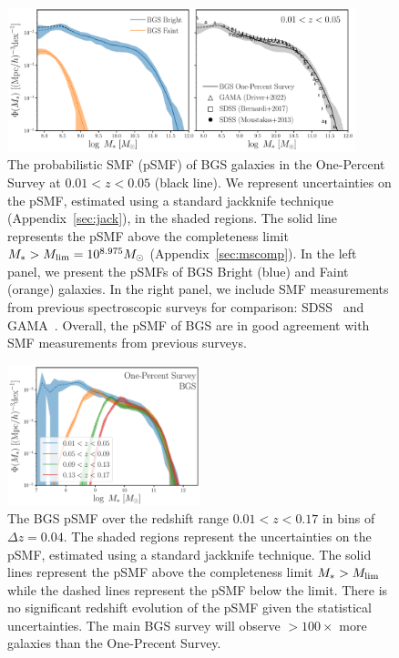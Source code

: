 \begin{figure}
\begin{center}
    \includegraphics[width=0.9\textwidth]{figs/psmf_bgs_any_comp.pdf} 
    \caption{
        The probabilistic SMF (pSMF) of BGS galaxies in the One-Percent Survey
        at $0.01 < z < 0.05$ (black line). 
        We represent uncertainties on the pSMF, estimated using a standard
        jackknife technique (Appendix~\ref{sec:jack}), in the shaded regions.
        The solid line represents the pSMF above the completeness limit 
        $M_* > M_{\rm lim} = 10^{8.975}M_\odot$ (Appendix~\ref{sec:mscomp}).
        In the left panel, we present the pSMFs of BGS Bright (blue) and
        Faint (orange) galaxies. 
        In the right panel, we include SMF measurements from previous
        spectroscopic surveys for comparison: SDSS~\citep{moustakas2013,
        bernardi2017} and GAMA~\citep{driver2022}. 
        Overall, the pSMF of BGS are in good agreement with SMF
        measurements from previous surveys.  
    }\label{fig:psmf}
\end{center}
\end{figure}

\begin{figure}
\begin{center}
    \includegraphics[width=0.5\textwidth]{figs/psmf_bgs_any_zevo.pdf} 
    \caption{
        The BGS pSMF over the redshift range $0.01 < z < 0.17$ in bins of
        $\Delta z = 0.04$. 
        The shaded regions represent the uncertainties on the pSMF, estimated
        using a standard jackknife technique.
        The solid lines represent the pSMF above the completeness limit 
        $M_* > M_{\rm lim}$ while the dashed lines represent the pSMF below
        the limit.
        There is no significant redshift evolution of the pSMF given the
        statistical uncertainties. 
        The main BGS survey will observe $>100\times$ more galaxies than the
        One-Precent Survey. 
    }\label{fig:psmfz}
\end{center}
\end{figure}

